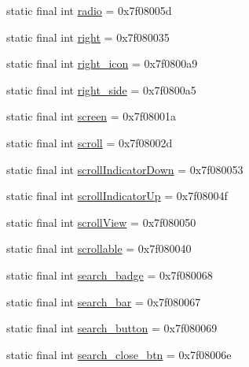 \begin{CompactItemize}
\item 
static final int \hyperlink{classandroid_1_1support_1_1v7_1_1cardview_1_1_r_1_1id_cc36daeb8bf4c47981947c85ee9db056}{radio} = 0x7f08005d
\item 
static final int \hyperlink{classandroid_1_1support_1_1v7_1_1cardview_1_1_r_1_1id_78cc4626802996ff9a0e85e71883bc06}{right} = 0x7f080035
\item 
static final int \hyperlink{classandroid_1_1support_1_1v7_1_1cardview_1_1_r_1_1id_218687857e9688f1ccd4a44ad1a6373c}{right\_\-icon} = 0x7f0800a9
\item 
static final int \hyperlink{classandroid_1_1support_1_1v7_1_1cardview_1_1_r_1_1id_bb75bb4fa82f9ad19eedc00266ed7ac8}{right\_\-side} = 0x7f0800a5
\item 
static final int \hyperlink{classandroid_1_1support_1_1v7_1_1cardview_1_1_r_1_1id_4f2f7f2b1b4bc84c004653ac2153b336}{screen} = 0x7f08001a
\item 
static final int \hyperlink{classandroid_1_1support_1_1v7_1_1cardview_1_1_r_1_1id_593858cac4963507c01fa0c3f04558a8}{scroll} = 0x7f08002d
\item 
static final int \hyperlink{classandroid_1_1support_1_1v7_1_1cardview_1_1_r_1_1id_944ed6c47b16f83bb11b2d7c1485772f}{scrollIndicatorDown} = 0x7f080053
\item 
static final int \hyperlink{classandroid_1_1support_1_1v7_1_1cardview_1_1_r_1_1id_009520b9c9d7512c36569347748d4a40}{scrollIndicatorUp} = 0x7f08004f
\item 
static final int \hyperlink{classandroid_1_1support_1_1v7_1_1cardview_1_1_r_1_1id_954aa963ec5575239d604002dee1c330}{scrollView} = 0x7f080050
\item 
static final int \hyperlink{classandroid_1_1support_1_1v7_1_1cardview_1_1_r_1_1id_bbe9f03ce70603d5ee0def2319e61fc4}{scrollable} = 0x7f080040
\item 
static final int \hyperlink{classandroid_1_1support_1_1v7_1_1cardview_1_1_r_1_1id_de83a0c850bd59ba2cf4715eb7a18dd7}{search\_\-badge} = 0x7f080068
\item 
static final int \hyperlink{classandroid_1_1support_1_1v7_1_1cardview_1_1_r_1_1id_9a73b503178e7e1f683391699d6e593b}{search\_\-bar} = 0x7f080067
\item 
static final int \hyperlink{classandroid_1_1support_1_1v7_1_1cardview_1_1_r_1_1id_bdc84927ea9089580206b26f9f8860d0}{search\_\-button} = 0x7f080069
\item 
static final int \hyperlink{classandroid_1_1support_1_1v7_1_1cardview_1_1_r_1_1id_66dfd66f2784f8ac11560f849e916860}{search\_\-close\_\-btn} = 0x7f08006e

\end{CompactItemize}
